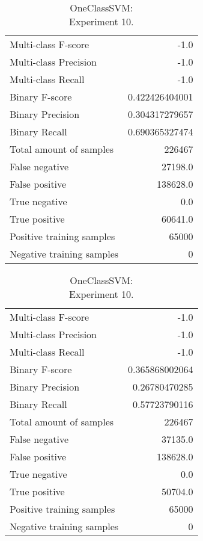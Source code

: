 \begin{table}[H]
\begin{minipage}{0.5\textwidth}

\caption{OneClassSVM: \\Experiment 9.}

\centering
\begin{tabular}{l r}
\toprule
Multi-class F-score & -1.0 \\
Multi-class Precision & -1.0 \\
Multi-class Recall & -1.0 \\
\midrule
Binary F-score & 0.422426404001 \\
Binary Precision & 0.304317279657 \\
Binary Recall & 0.690365327474 \\
\midrule
Total amount of samples & 226467 \\
False negative & 27198.0 \\
False positive & 138628.0 \\
True negative & 0.0 \\
True positive & 60641.0 \\
\midrule
Positive training samples & 65000 \\
Negative training samples & 0 \\
\bottomrule
\end{tabular}
\end{minipage}
\hfillx
\begin{minipage}{0.5\textwidth}

\caption{OneClassSVM: \\Experiment 10.}

\centering
\begin{tabular}{l r}
\toprule
Multi-class F-score & -1.0 \\
Multi-class Precision & -1.0 \\
Multi-class Recall & -1.0 \\
\midrule
Binary F-score & 0.365868002064 \\
Binary Precision & 0.26780470285 \\
Binary Recall & 0.57723790116 \\
\midrule
Total amount of samples & 226467 \\
False negative & 37135.0 \\
False positive & 138628.0 \\
True negative & 0.0 \\
True positive & 50704.0 \\
\midrule
Positive training samples & 65000 \\
Negative training samples & 0 \\
\bottomrule
\end{tabular}
\end{minipage}
\end{table}
